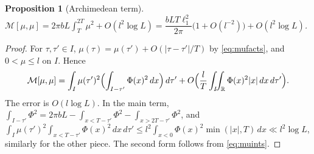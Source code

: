 \documentclass[11pt]{amsart}
\newtheorem{proposition}[theorem]{Proposition}
\theoremstyle{definition}
\theoremstyle{remark}
\numberwithin{equation}{section}
\newcommand{\RR}{\mathbb{R}}
\newcommand{\dd}{\,d}
\begin{document}
\begin{proposition}[Archimedean term]\label{prop:mumu}
$\mathcal M[\mu,\mu]=2\pi bL\int_T^{2T}\mu^2+O(l^2\log L)=\dfrac{bLT\ell_1^2}{2\pi}\bigl(1+O(l^{-2})\bigr)+O(l^2\log L)$.
\end{proposition}
\begin{proof}
For $\tau,\tau'\in I$, $\mu(\tau)=\mu(\tau')+O(|\tau-\tau'|/T)$ by \eqref{eq:mufacts}, and $0<\mu\le l$ on $I$. Hence
\[
\mathcal M[\mu,\mu]=\int_I\mu(\tau')^2\Bigl(\int_{I-\tau'}\Phi(x)^2\dd x\Bigr)\dd\tau'+O\Bigl(\frac lT\int_I\!\!\int_\RR\Phi(x)^2|x|\dd x\dd\tau'\Bigr).
\]
The error is $O(l\log L)$. In the main term, $\int_{I-\tau'}\Phi^2=2\pi bL-\int_{x<T-\tau'}\Phi^2-\int_{x>2T-\tau'}\Phi^2$, and
$\int_I\mu(\tau')^2\int_{x<T-\tau'}\Phi(x)^2\dd x\dd\tau'\le l^2\int_{x<0}\Phi(x)^2\min(|x|,T)\dd x\ll l^2\log L$, similarly for the other piece. The second form follows from \eqref{eq:muints}.
\end{proof}
\end{document}
